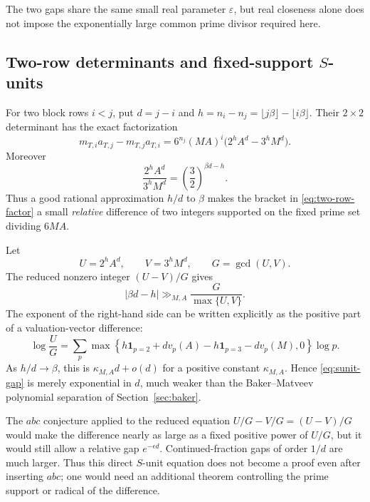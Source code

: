 \documentclass[11pt,oneside]{article}
\theoremstyle{definition}
\theoremstyle{remark}
\begin{document}
The two gaps share the same small real parameter $\varepsilon$, but real closeness alone does
not impose the exponentially large common prime divisor required here.

\subsection{Two-row determinants and fixed-support \texorpdfstring{$S$}{S}-units}

For two block rows $i<j$, put $d=j-i$ and
$h=n_i-n_j=\lfloor j\beta\rfloor-\lfloor i\beta\rfloor$.  Their $2\times2$ determinant has
the exact factorization
\begin{equation}\label{eq:two-row-factor}
 m_{T,i}a_{T,j}-m_{T,j}a_{T,i}
 =6^{n_j}(MA)^i\bigl(2^hA^d-3^hM^d\bigr).
\end{equation}
Moreover
\begin{equation}\label{eq:two-row-ratio}
 \frac{2^hA^d}{3^hM^d}
 =\left(\frac32\right)^{\beta d-h}.
\end{equation}
Thus a good rational approximation $h/d$ to $\beta$ makes the bracket in
\eqref{eq:two-row-factor} a small \emph{relative} difference of two integers supported on the
fixed prime set dividing $6MA$.

Let
\[
 U=2^hA^d,
 \qquad V=3^hM^d,
 \qquad G=\gcd(U,V).
\]
The reduced nonzero integer $(U-V)/G$ gives
\begin{equation}\label{eq:sunit-gap}
 |\beta d-h|
 \gg_{M,A}\frac{G}{\max\{U,V\}}.
\end{equation}
The exponent of the right-hand side can be written explicitly as the positive part of a
valuation-vector difference:
\begin{equation}\label{eq:sunit-rate}
 \log\frac{U}{G}
 =\sum_p
 \max\!\left
 \{h\mathbf1_{p=2}+d v_p(A)
   -h\mathbf1_{p=3}-d v_p(M),0\right\}\log p.
\end{equation}
As $h/d\to\beta$, this is $\kappa_{M,A}d+o(d)$ for a positive constant
$\kappa_{M,A}$.  Hence \eqref{eq:sunit-gap} is merely exponential in $d$, much weaker than the
Baker--Matveev polynomial separation of Section~\ref{sec:baker}.

The $abc$ conjecture applied to the reduced equation $U/G-V/G=(U-V)/G$ would make the
difference nearly as large as a fixed positive power of $U/G$, but it would still allow a
relative gap $e^{-\epsilon d}$.  Continued-fraction gaps of order $1/d$ are much larger.
Thus this direct $S$-unit equation does not become a proof even after inserting $abc$; one
would need an additional theorem controlling the prime support or radical of the difference.
\end{document}
